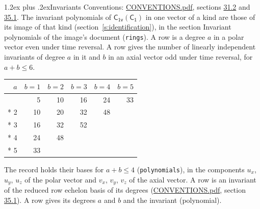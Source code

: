\documentclass[10pt,a4paper]{article}
\makeatletter
\renewcommand\section{\@startsection{section}{1}{\z@}{-3ex plus -1ex minus -.2ex}%
  {1.2ex plus .2ex}{\normalfont\large\sffamily\bfseries\color{parttitle}}}
\numberwithin{equation}{section}
\newcommand{\grp}[1]{\mathsf{#1}}
\makeatother
\begin{document}
\section{Invariants}\label{s:invariants}
Conventions: \href{../../CONVENTIONS.pdf}{CONVENTIONS.pdf}, sections \href{../../CONVENTIONS.pdf\#conv.31.2}{31.2} and \href{../../CONVENTIONS.pdf\#conv.35.1}{35.1}.
The invariant polynomials of $\grp{C_{1v}}(\grp{C_{1}})$ in one vector of a kind are those of its image of that kind (section~\ref{s:identification}), in the section Invariant polynomials of the image's document (\texttt{rings}).
\leavevmode\label{n:index.degree.polar}\label{n:index.degree.axial}A row is a degree $a$ in a polar vector even under time reversal. A row gives the number of linearly independent invariants of degree $a$ in it and $b$ in an axial vector odd under time reversal, for $a + b \le 6$.
{\small\begin{longtable}{@{}rrrrrr@{}}\toprule
$a$ & $b = 1$ & $b = 2$ & $b = 3$ & $b = 4$ & $b = 5$\\\midrule\endhead
\bottomrule\endfoot\endlastfoot
1 & 5 & 10 & 16 & 24 & 33\\*
2 & 10 & 20 & 32 & 48 & \\*
3 & 16 & 32 & 52 &  & \\*
4 & 24 & 48 &  &  & \\*
5 & 33 &  &  &  & \\
\bottomrule\end{longtable}}
\leavevmode\label{n:local.component.polar}\label{n:local.component.axial}The record holds their bases for $a + b \le 4$ (\texttt{polynomials}), in the components $u_{x}$, $u_{y}$, $u_{z}$ of the polar vector and $v_{x}$, $v_{y}$, $v_{z}$ of the axial vector. \label{n:head.polynomial}A row is an invariant of the reduced row echelon basis of its degrees (\href{../../CONVENTIONS.pdf}{CONVENTIONS.pdf}, section \href{../../CONVENTIONS.pdf\#conv.35.1}{35.1}). A row gives its degrees $a$ and $b$ and the invariant (polynomial).
\end{document}
